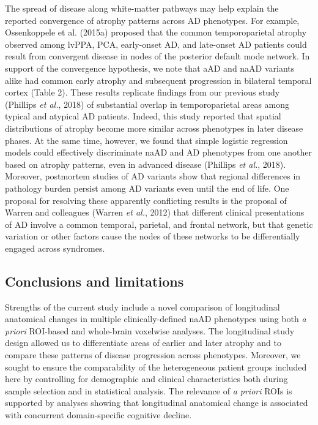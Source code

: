 \documentclass[]{article}
\begin{document}
The spread of disease along white-matter pathways may help explain the
reported convergence of atrophy patterns across AD phenotypes. For
example, Ossenkoppele et al. (2015a) proposed that the common
temporoparietal atrophy observed among lvPPA, PCA, early-onset AD, and
late-onset AD patients could result from convergent disease in nodes of
the posterior default mode network. In support of the convergence
hypothesis, we note that aAD and naAD variants alike had common early
atrophy and subsequent progression in bilateral temporal cortex (Table
2). These results replicate findings from our previous study (Phillips
\emph{et al.}, 2018) of substantial overlap in temporoparietal areas
among typical and atypical AD patients. Indeed, this study reported that
spatial distributions of atrophy become more similar across phenotypes
in later disease phases. At the same time, however, we found that simple
logistic regression models could effectively discriminate naAD and AD
phenotypes from one another based on atrophy patterns, even in advanced
disease (Phillips \emph{et al.}, 2018). Moreover, postmortem studies of
AD variants show that regional differences in pathology burden persist
among AD variants even until the end of life. One proposal for resolving
these apparently conflicting results is the proposal of Warren and
colleagues (Warren \emph{et al.}, 2012) that different clinical
presentations of AD involve a common temporal, parietal, and frontal
network, but that genetic variation or other factors cause the nodes of
these networks to be differentially engaged across syndromes.

\subsection*{Conclusions and
limitations}\label{conclusions-and-limitations}

Strengths of the current study include a novel comparison of
longitudinal anatomical changes in multiple clinically-defined naAD
phenotypes using both \emph{a priori} ROI-based and whole-brain
voxelwise analyses. The longitudinal study design allowed us to
differentiate areas of earlier and later atrophy and to compare these
patterns of disease progression across phenotypes. Moreover, we sought
to ensure the comparability of the heterogeneous patient groups included
here by controlling for demographic and clinical characteristics both
during sample selection and in statistical analysis. The relevance of
\emph{a priori} ROIs is supported by analyses showing that longitudinal
anatomical change is associated with concurrent domain-specific
cognitive decline.
\end{document}
